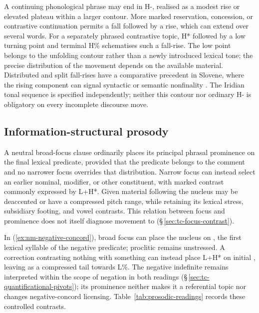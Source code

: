 A continuing phonological phrase may end in H-, realised as a modest rise
or elevated plateau within a larger contour. More marked reservation,
concession, or contrastive continuation permits a fall followed by a rise,
which can extend over several words. For a separately phrased contrastive
topic, H* followed by a low turning point and terminal H\% schematises
such a fall-rise. The low point belongs to the unfolding contour rather
than a newly introduced lexical tone; the precise distribution of the
movement depends on the available material. Distributed and split fall-rises
have a comparative precedent in Slovene, where the rising component can
signal syntactic or semantic nonfinality \cite{komar1999}. The Iridian
tonal sequence is specified independently; neither this contour nor
ordinary H- is obligatory on every incomplete discourse move.

\subsection{Information-structural prosody}\label{sec:phrasal-prominence}

A neutral broad-focus clause ordinarily places its principal phrasal
prominence on the final lexical predicate, provided that the predicate
belongs to the comment and no narrower focus overrides that distribution.
Narrow focus can instead select an earlier nominal, modifier, or other
constituent, with marked contrast commonly expressed by L+H*. Given
material following the nucleus may be deaccented or have a compressed
pitch range, while retaining its lexical stress, subsidiary footing, and
vowel contrasts. This relation between focus and prominence does not
itself diagnose movement to 
(§\,\ref{sec:tc-focus-contrast}).

In  
(\ref{ex:nm-negative-concord}), broad focus can place the nucleus on
, the first lexical syllable of the negative predicate;
proclitic  remains unstressed. A correction contrasting nothing
with something can instead place L+H* on initial , leaving
 as a compressed tail towards L\%. The negative
indefinite remains interpreted within the scope of negation in both
readings (§\,\ref{sec:tc-quantificational-pivots}); its prominence neither
makes it a referential topic nor changes negative-concord licensing.
Table~\ref{tab:prosodic-readings} records these controlled contrasts.

